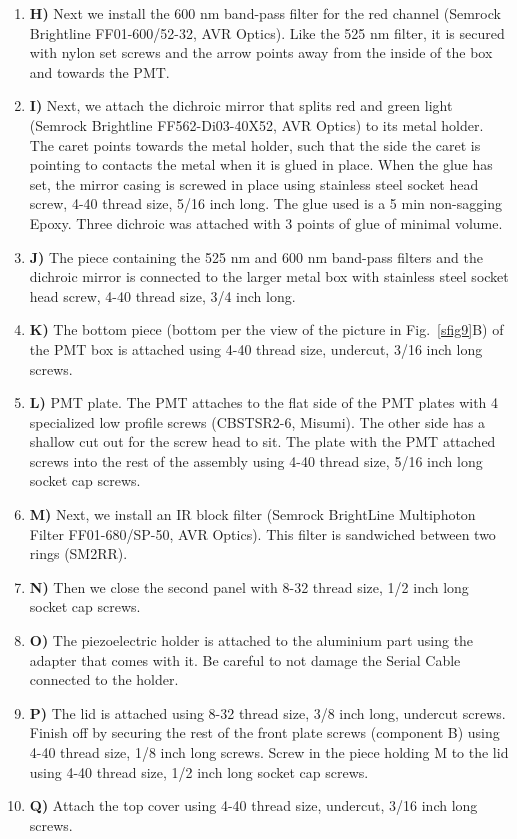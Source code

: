 \documentclass[10pt,letterpaper]{article}
\begin{document}
\begin{enumerate}[]
    \item \textbf{H)} Next we install the 600 nm band-pass filter for the red channel (Semrock Brightline FF01-600/52-32, AVR Optics). Like the 525 nm filter, it is secured with nylon set screws and the arrow points away from the inside of the box and towards the PMT.
    \item \textbf{I)} Next, we attach the dichroic mirror that splits red and green light (Semrock Brightline FF562-Di03-40X52, AVR Optics) to its metal holder. The caret points towards the metal holder, such that the side the caret is pointing to contacts the metal when it is glued in place. When the glue has set, the mirror casing is screwed in place using stainless steel socket head screw, 4-40 thread size, 5/16 inch long. The glue used is a 5 min non-sagging Epoxy. Three dichroic was attached with 3 points of glue of minimal volume.
    \item \textbf{J)} The piece containing the 525 nm and 600 nm band-pass filters and the dichroic mirror is connected to the larger metal box with stainless steel socket head screw, 4-40 thread size, 3/4 inch long.
    \item \textbf{K)} The bottom piece (bottom per the view of the picture in Fig.~\ref{sfig9}B) of the PMT box is attached using 4-40 thread size, undercut, 3/16 inch long screws.
    \item \textbf{L)} PMT plate. The PMT attaches to the flat side of the PMT plates with 4 specialized low profile screws (CBSTSR2-6, Misumi). The other side has a shallow cut out for the screw head to sit. The plate with the PMT attached screws into the rest of the assembly using 4-40 thread size, 5/16 inch long socket cap screws.
    \item \textbf{M)} Next, we install an IR block filter (Semrock BrightLine Multiphoton Filter FF01-680/SP-50, AVR Optics). This filter is sandwiched between two rings (SM2RR).
    \item \textbf{N)} Then we close the second panel with 8-32 thread size, 1/2 inch long socket cap screws.
    \item \textbf{O)} The piezoelectric holder is attached to the aluminium part using the adapter that comes with it. Be careful to not damage the Serial Cable connected to the holder.
    \item \textbf{P)} The lid is attached using 8-32 thread size, 3/8 inch long, undercut screws. Finish off by securing the rest of the front plate screws (component B) using 4-40 thread size, 1/8 inch long screws. Screw in the piece holding M to the lid using 4-40 thread size, 1/2 inch long socket cap screws.
    \item \textbf{Q)} Attach the top cover using 4-40 thread size, undercut, 3/16 inch long screws.
\end{enumerate}
%
\end{document}
